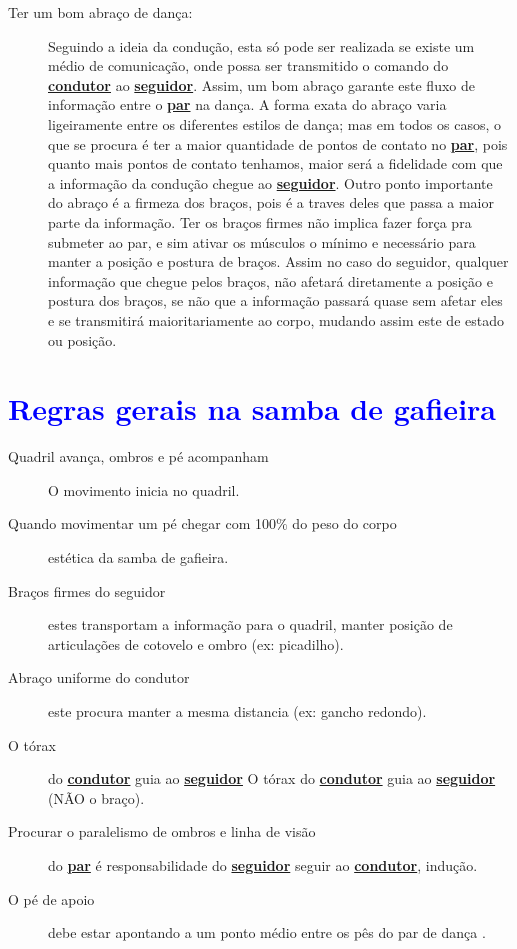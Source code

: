\begin{description}
\item[Ter um bom abraço de dança:] Seguindo a ideia da condução, esta só pode
ser realizada se existe um médio de comunicação, onde possa ser transmitido
o comando do \hyperref[def:Condutor]{\textbf{condutor}} ao \hyperref[def:Seguidor]{\textbf{seguidor}}. 
Assim, um bom abraço garante este fluxo de informação entre o \hyperref[def:Par]{\textbf{par}} na dança. 
A forma exata do abraço varia ligeiramente entre os diferentes estilos de dança;
mas em todos os casos, 
o que se procura é ter a maior quantidade de pontos de contato no \hyperref[def:Par]{\textbf{par}},
pois quanto mais pontos de contato tenhamos, 
maior será a fidelidade com que a informação da condução chegue ao \hyperref[def:Seguidor]{\textbf{seguidor}}.
Outro ponto importante do abraço é a firmeza dos braços, 
pois é a traves deles que passa a maior parte da informação.
Ter os braços firmes não implica fazer força pra submeter ao par,
e sim ativar os músculos o mínimo e necessário para manter a posição e postura de braços.
Assim no caso do seguidor, qualquer informação que chegue pelos braços,
não afetará diretamente a posição e postura dos braços, 
se não que a informação passará quase sem afetar eles e se transmitirá maioritariamente ao corpo,
mudando assim este de estado ou posição. 

\end{description}

\section{\textcolor{blue}{Regras gerais na samba de gafieira}}


\begin{description}
\item[Quadril avança, ombros e pé acompanham]  O movimento inicia no quadril.
\item[Quando movimentar um pé chegar com 100$\%$ do peso do corpo] estética da samba de gafieira.
\item[Braços firmes do seguidor] estes transportam a informação para o quadril, manter posição de articulações de cotovelo e ombro (ex: picadilho).
\item[Abraço uniforme do condutor] este procura manter a mesma distancia (ex: gancho redondo).
\item[O tórax] do \hyperref[def:Condutor]{\textbf{condutor}} guia ao \hyperref[def:Seguidor]{\textbf{seguidor}} O tórax do \hyperref[def:Condutor]{\textbf{condutor}} guia ao \hyperref[def:Seguidor]{\textbf{seguidor}} (NÃO o braço).
\item[Procurar o paralelismo de ombros e linha de visão] do \hyperref[def:Par]{\textbf{par}} é responsabilidade do \hyperref[def:Seguidor]{\textbf{seguidor}} seguir ao \hyperref[def:Condutor]{\textbf{condutor}}, indução.
\item[O pé de apoio] debe estar apontando a um ponto médio entre os pês do par de dança .
\end{description}
